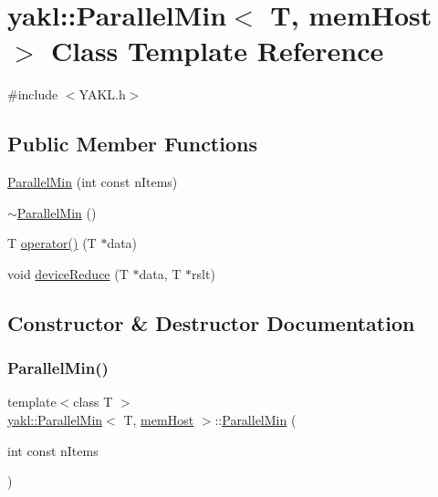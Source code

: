 \hypertarget{classyakl_1_1ParallelMin_3_01T_00_01memHost_01_4}{}\section{yakl\+:\+:Parallel\+Min$<$ T, mem\+Host $>$ Class Template Reference}
\label{classyakl_1_1ParallelMin_3_01T_00_01memHost_01_4}


{\ttfamily \#include $<$Y\+A\+K\+L.\+h$>$}

\subsection*{Public Member Functions}
\begin{DoxyCompactItemize}
\item 
\hyperlink{classyakl_1_1ParallelMin_3_01T_00_01memHost_01_4_a4dc815974df6dd8f80f2a805ac0b8cb9}{Parallel\+Min} (int const n\+Items)
\item 
\hyperlink{classyakl_1_1ParallelMin_3_01T_00_01memHost_01_4_a9d54821f75ffbb9c02254e0fdb56dd6b}{$\sim$\+Parallel\+Min} ()
\item 
T \hyperlink{classyakl_1_1ParallelMin_3_01T_00_01memHost_01_4_af9e3dfca7468cea66e3a007dda830cb2}{operator()} (T $\ast$data)
\item 
void \hyperlink{classyakl_1_1ParallelMin_3_01T_00_01memHost_01_4_a343aaaacc5d4d030eb83c4483876cbcf}{device\+Reduce} (T $\ast$data, T $\ast$rslt)
\end{DoxyCompactItemize}


\subsection{Constructor \& Destructor Documentation}
\mbox{\label{classyakl_1_1ParallelMin_3_01T_00_01memHost_01_4_a4dc815974df6dd8f80f2a805ac0b8cb9}} 
\subsubsection{\texorpdfstring{Parallel\+Min()}{ParallelMin()}}
{\footnotesize\ttfamily template$<$class T $>$ \\
\hyperlink{classyakl_1_1ParallelMin}{yakl\+::\+Parallel\+Min}$<$ T, \hyperlink{namespaceyakl_aae8a8c910fec7cef7db68c9658c16405}{mem\+Host} $>$\+::\hyperlink{classyakl_1_1ParallelMin}{Parallel\+Min} (\begin{DoxyParamCaption}\item[{int const}]{n\+Items }\end{DoxyParamCaption})\hspace{0.3cm}{\ttfamily [inline]}}


